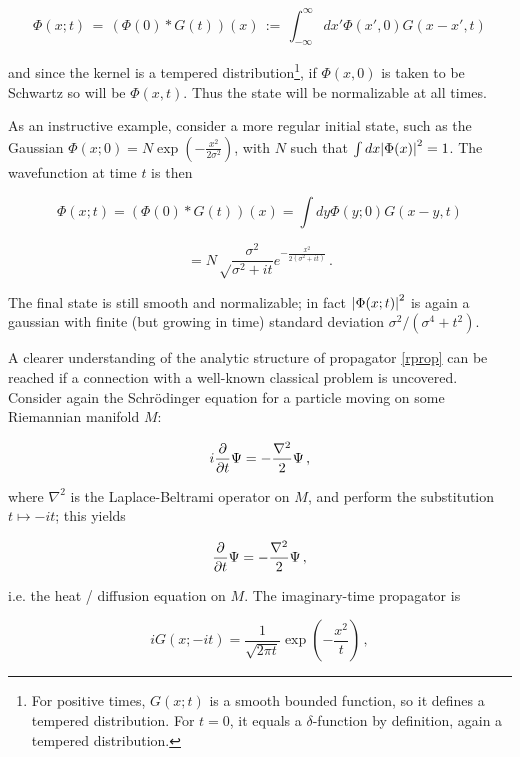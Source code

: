 \documentclass{article}
\newcommand{\intR}{\int_{-\infty}^\infty}
\begin{document}
\begin{equation*}
    \Phi(x;t) \, = \, \left(\Phi(0) * G(t) \right)(x) \, := \, \intR dx' \Phi(x',0) G(x-x',t)
\end{equation*}

and since the kernel is a tempered distribution\footnote{For positive times, $G(x;t)$ is a smooth bounded function, so it defines a tempered distribution. For $t=0$, it equals a $\delta$-function by definition, again a tempered distribution.}, if $\Phi(x,0)$ is taken to be Schwartz so will be $\Phi(x,t)$. Thus the state will be normalizable at all times.

As an instructive example, consider a more regular initial state, such as the Gaussian $\Phi(x;0) = N \exp(-\frac{x^2}{2\sigma^2} )$, with $N$ such that $\int dx \abs{\Phi(x)}^2 = 1$. The wavefunction at time $t$ is then

\begin{equation*}
    \Phi(x;t) = \left( \Phi(0) * G(t) \right)(x) = \int dy \Phi(y;0) G(x-y,t)
\end{equation*}

\begin{equation*}
    = N \sqrt\frac{\sigma^2}{\sigma^2 + it} e^{-\frac{x^2}{2(\sigma^2 + it)}}\,.
\end{equation*}

The final state is still smooth and normalizable; in fact $\abs{\Phi(x;t)}^2$ is again a gaussian with finite (but growing in time) standard deviation $\sigma^2/(\sigma^4 + t^2)$.

A clearer understanding of the analytic structure of propagator \eqref{rprop} can be reached if a connection with a well-known classical problem is uncovered. Consider again the Schr\"odinger equation for a particle moving on some Riemannian manifold $M$:

\begin{equation*}
    i \pdv{t} \Psi = - \frac{\nabla^2}{2} \Psi\,,
\end{equation*}

where $\nabla^2$ is the Laplace-Beltrami operator on $M$, and perform the substitution $t \mapsto -it$; this yields

\begin{equation*}
    \pdv{t} \Psi = - \frac{\nabla^2}{2} \Psi\,,
\end{equation*}

i.e. the heat / diffusion equation on $M$. The imaginary-time propagator is

\begin{equation}\label{imrprop}
    i G(x;-it) = \frac{1}{\sqrt{2\pi t}} \exp(-\frac{x^2}{t})\,,
\end{equation}
\end{document}
